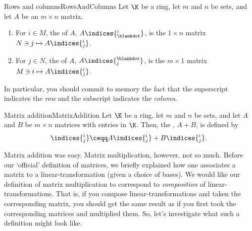 \begin{dfn}{Rows and columns}{RowsAndColumns}
	Let $\K$ be a ring, let $m$ and $n$ be sets, and let $A$ be an $m\times n$ matrix.
	\begin{enumerate}
		\item For $i\in M$, the  of $A$, $A\indices{^i_{\blankdot}}$, is the $1\times n$ matrix $N\ni j\mapsto A\indices{^i_j}$.
		\item For $j\in N$, the  of $A$, $A\indices{^{\blankdot}_j}$, is the $m\times 1$ matrix $M\ni i\mapsto A\indices{^i_j}$.
	\end{enumerate}
	\begin{rmk}
		In particular, you should commit to memory the fact that the superscript indicates the \emph{row} and the subscript indicates the \emph{column}.
	\end{rmk}
\end{dfn}
\begin{dfn}{Matrix addition}{MatrixAddition}
	Let $\K$ be a ring, let $m$ and $n$ be sets, and let $A$ and $B$ be $m\times n$ matrices with entries in $\K$.  Then, the , $A+B$, is defined by
	\begin{equation}
	[A+B]\indices{^i_j}\ceqq A\indices{^i_j}+B\indices{^i_j}.
	\end{equation}
\end{dfn}
Matrix addition was easy.  Matrix multiplication, however, not so much.  Before our `official' definition of matrices, we briefly explained how one associates a matrix to a linear-transformation (given a choice of bases).  We would like our definition of matrix multiplication to correspond to \emph{composition} of linear-transformations.  That is, if you compose linear-transformations and taken the corresponding matrix, you should get the same result as if you first took the corresponding matrices and multiplied them.  So, let's investigate what such a definition might look like.

